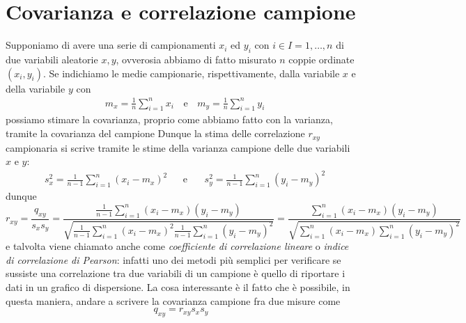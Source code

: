 \documentclass{report}
\begin{document}
\section{Covarianza e correlazione campione}
Supponiamo di avere una serie di campionamenti $x_i$ ed $y_i$ con $i \in I={1, \ldots, n}$ di due variabili aleatorie $x, y$, ovverosia abbiamo di fatto misurato $n$ coppie ordinate $(x_i, y_i)$. Se indichiamo le medie campionarie, rispettivamente, dalla variabile $x$ e della variabile $y$ con
\begin{align*}
	&m_x = \frac{1}{n} \sum_{i = 1}^n x_i \, &\text{e} \, &m_y  = \frac{1}{n} \sum_{i = 1}^n y_i
\end{align*}
possiamo stimare la covarianza, proprio come abbiamo fatto con la varianza, tramite la covarianza del campione
\noindent Dunque la stima delle correlazione $r_{xy}$ campionaria si scrive tramite le stime della varianza campione delle due variabili $x$ e $y$:
\begin{align*}
	&s_x^2 = \frac{1}{n-1} \sum_{i=1}^n (x_i - m_x)^2  & &\text{e} & \, &s_y^2 = \frac{1}{n-1} \sum_{i=1}^n (y_i - m_y)^2
\end{align*}
dunque
\begin{equation}
	r_{xy} = \frac{q_{xy}}{s_x s_y} = \frac{\frac{1}{n-1}\sum\limits_{i=1}^n (x_i-m_x)(y_i-m_y)}{\sqrt{\frac{1}{n-1} \sum\limits_{i=1}^n (x_i - m_x)^2 \frac{1}{n-1} \sum\limits_{i=1}^n (y_i - m_y)^2}} = \frac{\sum\limits_{i=1}^n (x_i - m_x)(y_i - m_y)}{\sqrt{\sum\limits_{i=1}^n (x_i - m_x) \sum\limits_{i=1}^n (y_i - m_y)^2}}
\end{equation}
e talvolta viene chiamato anche come \emph{coefficiente di correlazione lineare} o \emph{indice di correlazione di Pearson}: infatti uno dei metodi più semplici per verificare se sussiste una correlazione tra due variabili di un campione è quello di riportare i dati in un grafico di dispersione.
La cosa interessante è il fatto che è possibile, in questa maniera, andare a scrivere la covarianza campione fra due misure come
\begin{equation}
	q_{xy} = r_{xy} s_x s_y
\end{equation}
\end{document}
